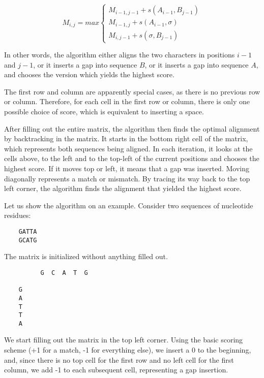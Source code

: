 \[ M_{i, j} = max
    \begin{cases}
        M_{i-1, j-1} + s(A_{i-1}, B_{j-1}) \\
        M_{i-1, j} + s(A_{i-1}, \sigma)    \\
        M_{i, j-1} + s(\sigma, B_{j-1})
    \end{cases}
\]

In other words, the algorithm either aligns the two characters in positions $i-1$ and $j-1$, or it inserts a gap into sequence $B$, or it inserts a gap into sequence $A$,
and chooses the version which yields the highest score.

The first row and column are apparently special cases, as there is no previous row or column. Therefore, for each cell in the first row or column, there is
only one possible choice of score, which is equivalent to inserting a space.

After filling out the entire matrix, the algorithm then finds the optimal alignment by backtracking in the matrix. It starts in the bottom right
cell of the matrix, which represents both sequences being aligned. In each iteration, it looks at the cells above, to the left and to the top-left
of the current positions and chooses the highest score. If it moves top or left, it means that a gap was inserted. Moving diagonally represents a match
or mismatch. By tracing its way back to the top left corner, the algorithm finds the alignment that yielded the highest score.

Let us show the algorithm on an example. Consider two sequences of nucleotide residues:

\begin{verbatim}
    GATTA
    GCATG
\end{verbatim}

The matrix is initialized without anything filled out.


\begin{verbatim}
          G  C  A  T  G
      
    G 
    A 
    T 
    T 
    A 
\end{verbatim}

We start filling out the matrix in the top left corner. Using the basic scoring scheme (+1 for a match, -1 for everything else), we insert a 0
to the beginning, and, since there is no top cell for the first row and no left cell for the first column, we add -1 to each subsequent cell,
representing a gap insertion.

